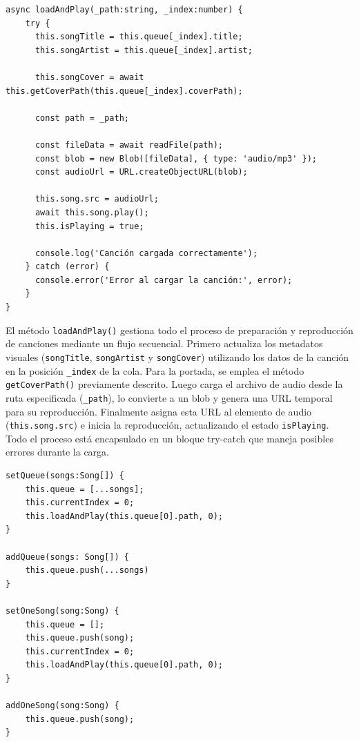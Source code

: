 \documentclass[11pt, a4paper]{article}
\begin{document}
                \begin{lstlisting}[caption={loadAndPlay()}]
async loadAndPlay(_path:string, _index:number) {
    try {
      this.songTitle = this.queue[_index].title;
      this.songArtist = this.queue[_index].artist;
      
      this.songCover = await this.getCoverPath(this.queue[_index].coverPath);

      const path = _path;
      
      const fileData = await readFile(path);
      const blob = new Blob([fileData], { type: 'audio/mp3' });
      const audioUrl = URL.createObjectURL(blob);
      
      this.song.src = audioUrl;
      await this.song.play();
      this.isPlaying = true;
      
      console.log('Canción cargada correctamente');
    } catch (error) {
      console.error('Error al cargar la canción:', error);
    }
}
                \end{lstlisting}

                El método \texttt{loadAndPlay()} gestiona todo el proceso de preparación y reproducción de canciones mediante un flujo secuencial. Primero actualiza los metadatos visuales (\texttt{songTitle}, \texttt{songArtist} y \texttt{songCover}) utilizando los datos de la canción en la posición \texttt{\_index} de la cola. Para la portada, se emplea el método \texttt{getCoverPath()} previamente descrito. Luego carga el archivo de audio desde la ruta especificada (\texttt{\_path}), lo convierte a un blob y genera una URL temporal para su reproducción. Finalmente asigna esta URL al elemento de audio (\texttt{this.song.src}) e inicia la reproducción, actualizando el estado \texttt{isPlaying}. Todo el proceso está encapsulado en un bloque try-catch que maneja posibles errores durante la carga.

                \begin{lstlisting}[caption={set y add}]
setQueue(songs:Song[]) {
    this.queue = [...songs];
    this.currentIndex = 0;
    this.loadAndPlay(this.queue[0].path, 0);
}

addQueue(songs: Song[]) {
    this.queue.push(...songs)
}

setOneSong(song:Song) {
    this.queue = [];
    this.queue.push(song);
    this.currentIndex = 0;
    this.loadAndPlay(this.queue[0].path, 0);
}

addOneSong(song:Song) {
    this.queue.push(song);
}
                \end{lstlisting}
\end{document}
